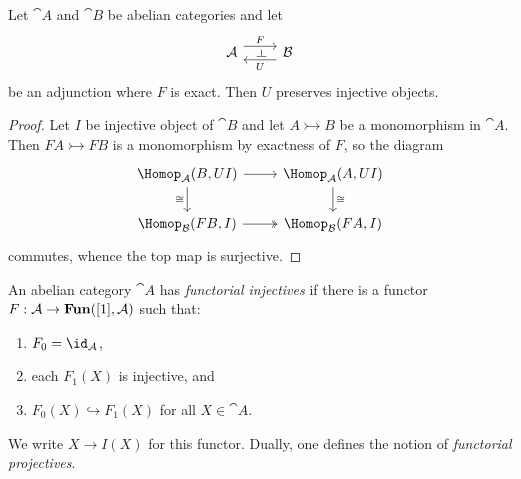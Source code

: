 \documentclass[../main.tex]{subfiles}
\begin{document}
\begin{lem}\label{lem:right-adjoint-to-exact-functor-preserves-injectives}
    Let $\cat A$ and $\cat B$ be abelian categories and let
    \begin{equation*}
      \begin{tikzcd}
        \cat A \ar[r, "F"{name=leftadj}, shift left=2] & \cat B \ar[l, "U"{name=rightadj}, shift left=2]
        \ar[from=leftadj, to=rightadj, phantom, "\leftadj" marking]
      \end{tikzcd}
    \end{equation*}
  be an adjunction where $F$ is exact. Then $U$ preserves injective objects.
\end{lem}
\begin{proof}
    Let $I$ be injective object of \(\cat B\) and let $A \rightarrowtail B$ be a monomorphism in $\cat A$. Then $FA \rightarrowtail FB$ is a monomorphism by exactness of $F$, so the diagram
\[\begin{tikzcd}
	{\Hom[\cat A](B, UI)} & {\Hom[\cat A](A, UI)} \\
	{\Hom[\cat B](FB, I)} & {\Hom[\cat B](FA, I)}
	\arrow[from=1-1, to=1-2]
	\arrow["\cong"', from=1-1, to=2-1]
	\arrow["\cong", from=1-2, to=2-2]
	\arrow[two heads, from=2-1, to=2-2]
\end{tikzcd}\]
commutes, whence the top map is surjective.
\end{proof}

\begin{defn}
    An abelian category $\cat A$ has \emph{functorial injectives} if there is a functor $F\colon \cat A \to \catFunctor([1], \cat A)$ such that:
    \begin{enumerate}
        \item $F_0 = \id_{\cat A}$,
        \item each $F_1(X)$ is injective, and
        \item $F_0(X)\hookrightarrow F_1(X)$ for all $X\in \cat A$.
    \end{enumerate}
    We write $X\to I(X)$ for this functor. Dually, one defines the notion of \emph{functorial projectives}. 
\end{defn}
\end{document}
